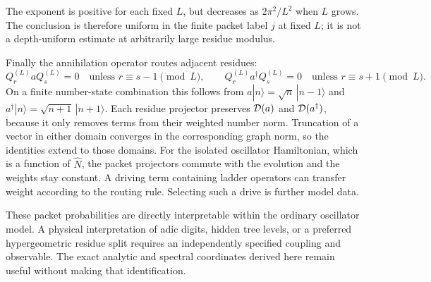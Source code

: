 The exponent is positive for each fixed $L$, but decreases as
$2\pi^2/L^2$ when $L$ grows. The conclusion is therefore uniform in
the finite packet label $j$ at fixed $L$; it is not a depth-uniform
estimate at arbitrarily large residue modulus.

Finally the annihilation operator routes adjacent residues:
\begin{equation}
 Q_r^{(L)}aQ_s^{(L)}=0\quad\text{unless }r\equiv s-1\pmod L,
 \qquad
 Q_r^{(L)}a^\dagger Q_s^{(L)}=0\quad\text{unless }r\equiv s+1\pmod L.
 \label{a-spectral-ladder-routing}
\end{equation}
On a finite number-state combination this follows from
$a|n\rangle=\sqrt n\,|n-1\rangle$ and
$a^\dagger|n\rangle=\sqrt{n+1}\,|n+1\rangle$.
Each residue projector preserves $\mathcal D(a)$ and $\mathcal D(a^\dagger)$,
because it only removes terms from their weighted number norm.
Truncation of a vector in either domain converges in the corresponding
graph norm, so the identities extend to those domains.
For the isolated oscillator Hamiltonian, which is a function of
$\widehat N$, the packet projectors commute with the evolution and
the weights stay constant. A driving term containing ladder operators
can transfer weight according to the routing rule. Selecting such a
drive is further model data.

These packet probabilities are directly interpretable within the
ordinary oscillator model. A physical interpretation of adic digits,
hidden tree levels, or a preferred hypergeometric residue split requires
an independently specified coupling and observable. The exact analytic
and spectral coordinates derived here remain useful without making
that identification.

